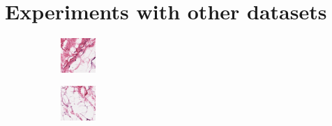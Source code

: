 \section{Experiments with other datasets}
\label{result_other}

\begin{figure}[h]
\centering
\begin{subfigure}[b]{.2\linewidth}
\includegraphics[width=\linewidth]{Figs/8864_idx5_x1251_y1651_class0.png}
\end{subfigure}
\begin{subfigure}[b]{.2\linewidth}
\includegraphics[width=\linewidth]{Figs/8864_idx5_x1201_y1801_class0.png}

\end{subfigure}
\end{figure}
